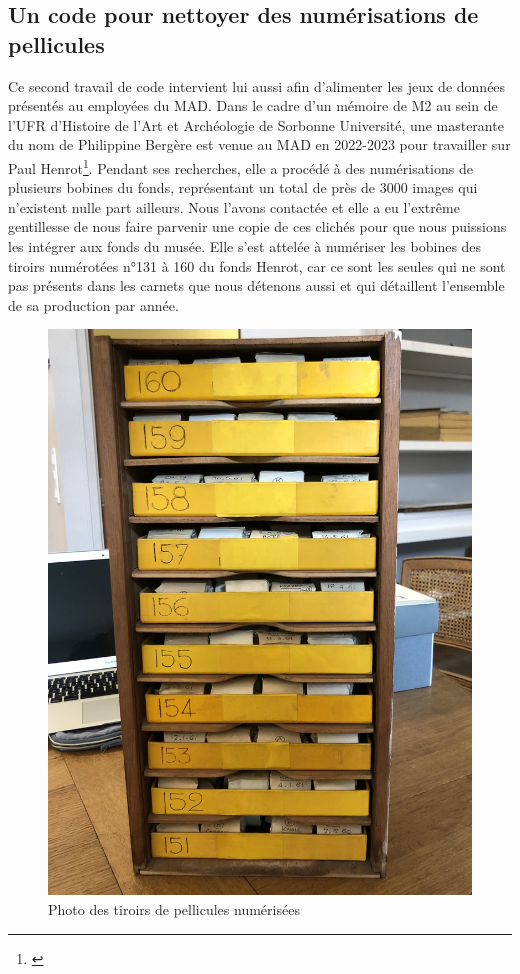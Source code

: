 \subsection{Un code pour nettoyer des numérisations de pellicules}

Ce second travail de code intervient lui aussi afin d'alimenter les jeux de données présentés au employé\wokisme e\wokisme s du MAD. Dans le cadre d'un mémoire de M2 au sein de l'UFR d'Histoire de l'Art et Archéologie de Sorbonne Université, une masterante du nom de Philippine Bergère est venue au MAD en 2022-2023 pour travailler sur Paul Henrot\footnote{\cite{bergere_paul_2023}}. Pendant ses recherches, elle a procédé à des numérisations de plusieurs bobines du fonds, représentant un total de près de 3000 images qui n'existent nulle part ailleurs. Nous l'avons contactée et elle a eu l'extrême gentillesse de nous faire parvenir une copie de ces clichés pour que nous puissions les intégrer aux fonds du musée. Elle s'est attelée à numériser les bobines des tiroirs numérotées n°131 à 160 du fonds Henrot, car ce sont les seules qui ne sont pas présents dans les carnets que nous détenons aussi et qui détaillent l'ensemble de sa production par année. 

\begin{figure}[H]
    \centering
    \includegraphics[width=0.75\linewidth]{Illustrations/tiroirs.jpg}
    \caption{Photo des tiroirs de pellicules numérisées}
    \label{fig:tiroirs}
\end{figure}

